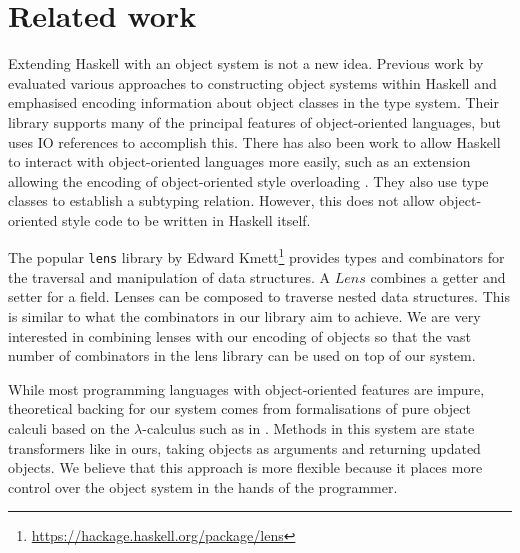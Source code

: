 

\section{Related work}
\label{sec:related}

Extending Haskell with an object system is not a new idea. Previous work by \citet{kiselyov2005haskell} evaluated various approaches to constructing object systems within Haskell and emphasised encoding information about object classes in the type system. Their library supports many of the principal features of object-oriented languages, but uses IO references to accomplish this. There has also been work to allow Haskell to interact with object-oriented languages more easily, such as an extension allowing the encoding of object-oriented style overloading \cite{shields2001object}. They also use type classes to establish a subtyping relation. However, this does not allow object-oriented style code to be written in Haskell itself.

The popular \texttt{lens} library by Edward Kmett\footnote{\url{https://hackage.haskell.org/package/lens}} provides types and combinators for the traversal and manipulation of data structures. A $\mathit{Lens}$ combines a getter and setter for a field. Lenses can be composed to traverse nested data structures. This is similar to what the combinators in our library aim to achieve. We are very interested in combining lenses with our encoding of objects so that the vast number of combinators in the lens library can be used on top of our system. 

While most programming languages with object-oriented features are impure, theoretical backing for our system comes from formalisations of pure object calculi based on the $\lambda$-calculus such as in \citet{pierce1994simple}. Methods in this system are state transformers like in ours, taking objects as arguments and returning updated objects. We believe that this approach is more flexible because it places more control over the object system in the hands of the programmer.


